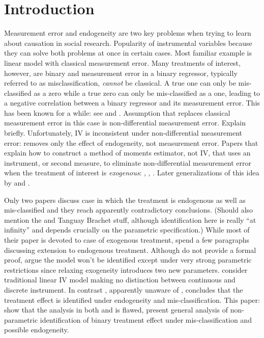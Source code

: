 \section{Introduction}

Measurement error and endogeneity are two key problems when trying to learn about causation in social research.
Popularity of instrumental variables because they can solve both problems at once in certain cases.
Most familiar example is linear model with classical measurement error.
Many treatments of interest, however, are binary and measurement error in a binary regressor, typically referred to as misclassification, \emph{cannot} be classical.
A true one can only be mis-classified as a zero while a true zero can only be mis-classified as a one, leading to a negative correlation between a binary regressor and its measurement error.
This has been known for a while: see \cite{Aigner} and \cite{Bollinger}.
Assumption that replaces classical measurement error in this case is non-differential measurement error.
Explain briefly.
Unfortunately, IV is inconsistent under non-differential measurement error: removes only the effect of endogeneity, not measurement error.
Papers that explain how to construct a method of moments estimator, not IV, that uses an instrument, or second measure, to eliminate non-differential measurement error when the treatment of interest is \emph{exogenous}: \cite{KRS}, \cite{BBS}, \cite{FL}.
Later generalizations of this idea by \cite{Lewbel} and \cite{Mahajan}.

Only two papers discuss case in which the treatment is endogenous as well as mis-classified and they reach apparently contradictory conclusions.
(Should also mention the \cite{Hausman} and Tanguay Brachet stuff, although identification here is really ``at infinity'' and depends crucially on the parametric specification.)
While most of their paper is devoted to case of exogenous treatment, \cite{FL} spend a few paragraphs discussing extension to endogenous treatment.
Although do not provide a formal proof, argue the model won't be identified except under very strong parametric restrictions since relaxing exogeneity introduces two new parameters.
\cite{FL} consider traditional linear IV model making no distinction between continuous and discrete instrument.
In contrast \cite{Mahajan}, apparently unaware of \cite{FL},  concludes that the treatment effect is identified under endogeneity and mis-classification.
This paper: show that the analysis in both \cite{FL} and \cite{Mahajan} is flawed, present general analysis of non-parametric identification of binary treatment effect under mis-classification and possible endogeneity. 

